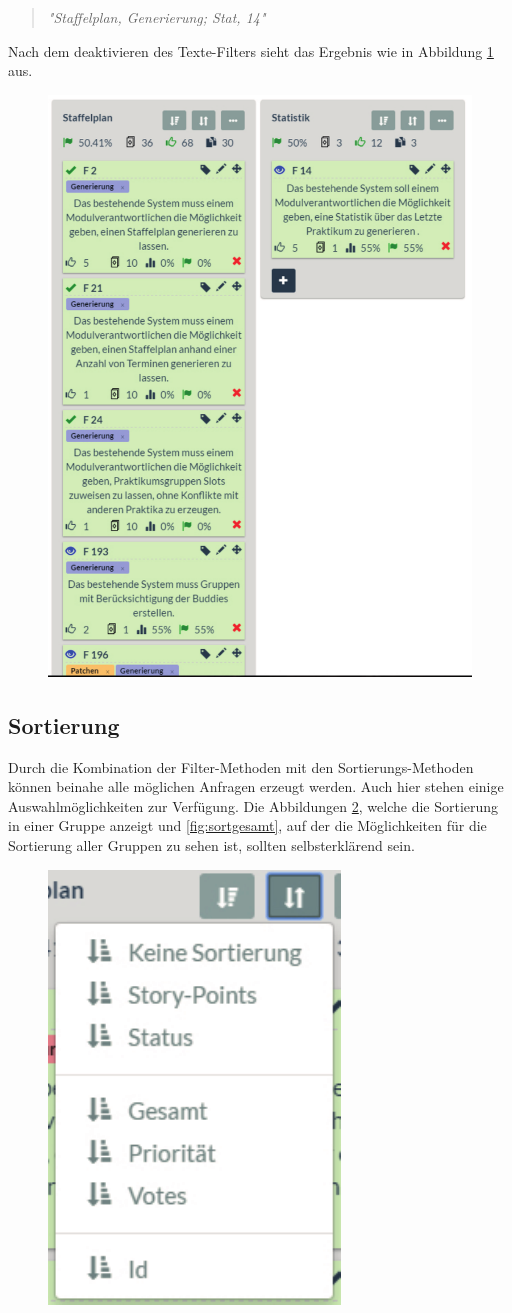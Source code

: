 \begin{quote}
\textit{"Staffelplan, Generierung; Stat, 14"}
\end{quote}

Nach dem deaktivieren des Texte-Filters sieht das Ergebnis wie in Abbildung \ref{fig:filterergebnis} aus.

\begin{figure}[!htb]
		\includegraphics[width=.5\textwidth]{images/filterergebnis.pdf}
\centering 
{} 
\label{fig:filterergebnis}
\end{figure}

\subsection{Sortierung}
Durch die Kombination der Filter-Methoden mit den Sortierungs-Methoden können beinahe alle möglichen Anfragen erzeugt werden. Auch hier stehen einige Auswahlmöglichkeiten zur Verfügung. Die Abbildungen \ref{fig:sortgruppe}, welche die Sortierung in einer Gruppe anzeigt und \ref{fig:sortgesamt}, auf der die Möglichkeiten für die Sortierung aller Gruppen zu sehen ist, sollten selbsterklärend sein.

\begin{figure}[!htb]
		\includegraphics[width=.25\textwidth]{images/sortierunggruppe.pdf}
\centering 
{} 
\label{fig:sortgruppe}
\end{figure}

